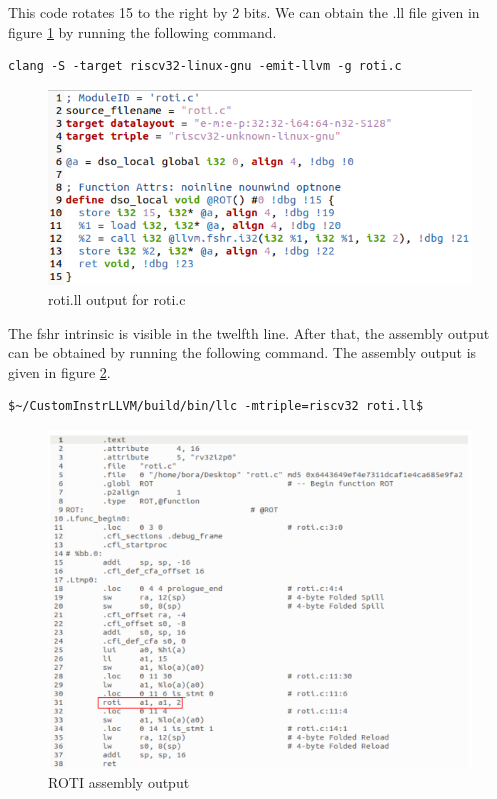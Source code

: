 This code rotates 15 to the right by 2 bits. We can obtain the .ll file given in figure \ref{fig:rotill_output_for_rotic} by running the following command.

\begin{lstlisting}
clang -S -target riscv32-linux-gnu -emit-llvm -g roti.c
\end{lstlisting}

\begin{figure}
    \centering
    \includegraphics{adding_new_instr/rotill_output_for_rotic.png}
    \caption{roti.ll output for roti.c}
    \label{fig:rotill_output_for_rotic}
\end{figure}

The fshr intrinsic is visible in the twelfth line. After that, the assembly output can be obtained by running the following command. The assembly output is given in figure \ref{fig:roti_assembly_output}.

\begin{lstlisting}
$~/CustomInstrLLVM/build/bin/llc -mtriple=riscv32 roti.ll$
\end{lstlisting}

\begin{figure}
    \centering
    \includegraphics{adding_new_instr/roti_assembly_output.png}
    \caption{ROTI assembly output}
    \label{fig:roti_assembly_output}
\end{figure}

